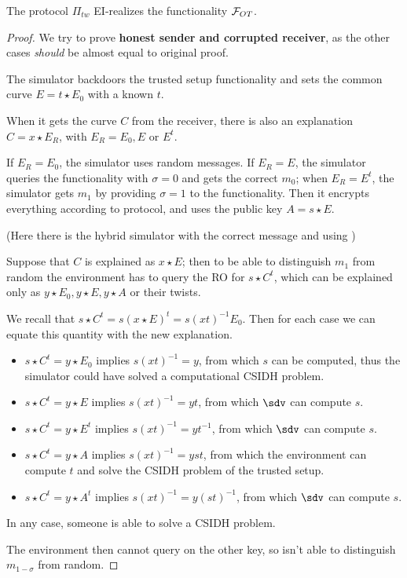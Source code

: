 \begin{theorem}
    The protocol $\Pi_{tw}$ EI-realizes the functionality $\mathcal{F}_{OT}$.
\end{theorem}
\begin{proof}
    We try to prove \textbf{honest sender and corrupted receiver}, as the other cases \emph{should} be almost equal to original proof.

    The simulator backdoors the trusted setup functionality and sets the common curve $E=t\star E_0$ with a known $t$.

    When it gets the curve $C$ from the receiver, there is also an explanation $C=x\star E_R$, with $E_R=E_0,E$ or $E^t$.

    If $E_R=E_0$, the simulator uses random messages. If $E_R=E$, the simulator queries the functionality with $\sigma=0$ and gets the correct $m_0$; when $E_R=E^t$, the simulator gets $m_1$ by providing $\sigma=1$ to the functionality. Then it encrypts everything according to protocol, and uses the public key $A=s\star E$.

    (Here there is the hybrid simulator with the correct message and using \indcpa)

    Suppose that $C$ is explained as $x\star E$; then to be able to distinguish $m_1$ from random the environment has to query the RO for $s\star C^t$, which can be explained only as $y\star E_0, y\star E, y\star A$ or their twists.

    We recall that $s\star C^t=s(x\star E)^t=s(xt)^{-1}E_0$. Then for each case we can equate this quantity with the new explanation.
    \begin{itemize}
        \item $s\star C^t = y\star E_0$ implies $s(xt)^{-1}=y$, from which $s$ can be computed, thus the simulator could have solved a computational CSIDH problem.
        \item $s\star C^t = y\star E$ implies $s(xt)^{-1}=yt$, from which $\sdv$ can compute $s$.
        \item $s\star C^t = y\star E^t$ implies $s(xt)^{-1}=yt^{-1}$, from which $\sdv$ can compute $s$.
        \item $s\star C^t = y\star A$ implies $s(xt)^{-1}=yst$, from which the environment can compute $t$ and solve the CSIDH problem of the trusted setup.
        \item $s\star C^t = y\star A^t$ implies $s(xt)^{-1}=y(st)^{-1}$, from which $\sdv$ can compute $s$.
    \end{itemize}
    In any case, someone is able to solve a CSIDH problem.

    The environment then cannot query on the other key, so isn't able to distinguish $m_{1-\sigma}$ from random.
\end{proof}
